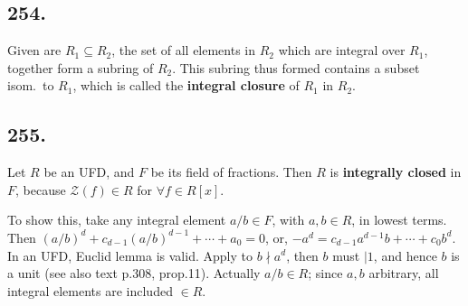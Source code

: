 \documentclass[12pt]{article}
\newcommand{\Ev}\forall%
\newcommand{\SF}[1]{ \mathscr{#1} }%
\newcommand{\Ss}[1]{\textsf{\bfseries{#1}}}%
\begin{document}
\subsection*{254.} Given are \(R_1 \subseteq R_2\), the set of all elements in \(R_2\) which are integral over \(R_1\), together form a subring of \(R_2\). 
This subring thus formed contains a subset isom.\ to \(R_1\), which is called the \Ss{integral closure} of \(R_1\) in \(R_2\). 

\subsection*{255.} Let \(R\) be an UFD, and \(F\) be its field of fractions. 
Then \(R\) is \Ss{integrally closed} in \(F\), because \(\SF{Z}(f) \in R\) for \(\Ev f \in R[x]\). \par
To show this, take any integral element \(a/b \in F\), with \(a,b \in R\), in lowest terms. 
Then \((a/b)^d +c_{d-1} (a/b)^{d-1} +\dotsb+ a_0 =0\), or, \(-a^d =c_{d-1} a^{d-1} b +\dotsb+ c_0 b^d\). 
In an UFD, Euclid lemma is valid. 
Apply to \(b \nmid a^d\), then \(b\) must \(\Big| 1\), and hence \(b\) is a unit (see also text p.308, prop.11). 
Actually \(a/b \in R\); since \(a,b\) arbitrary, all integral elements are included \(\in R\). 
\end{document}
